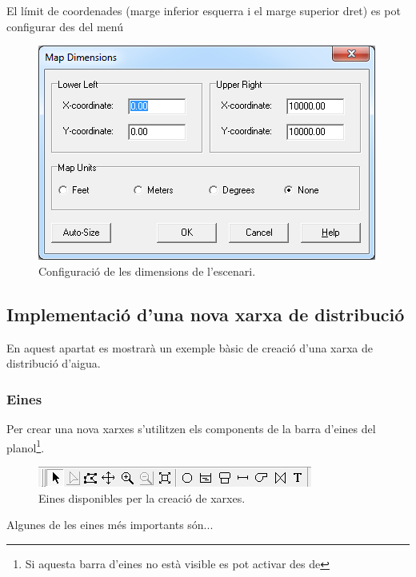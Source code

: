 \documentclass[12pt]{article}
\begin{document}
\\\\El límit de coordenades (marge inferior esquerra i el marge superior dret) es pot configurar des del menú 
\begin{figure}[h!]
	\centering
	\includegraphics[scale=.7]{imatges/epanet/3.png}
	\caption{Configuració de les dimensions de l'escenari.}
\end{figure}

\pagebreak
\subsection{Implementació d'una nova xarxa de distribució\label{xarxaEPANET}}
En aquest apartat es mostrarà un exemple bàsic de creació d'una xarxa de distribució d'aigua.
\subsubsection{Eines}
Per crear una nova xarxes s'utilitzen els components de la barra d'eines del planol\footnote{Si aquesta barra d'eines no està visible es pot activar des de }.
\begin{figure}[h!]
	\centering
	\includegraphics[scale=1]{imatges/epanet/4.png}
	\caption{Eines disponibles per la creació de xarxes.}
\end{figure}
Algunes de les eines més importants són...
\end{document}
